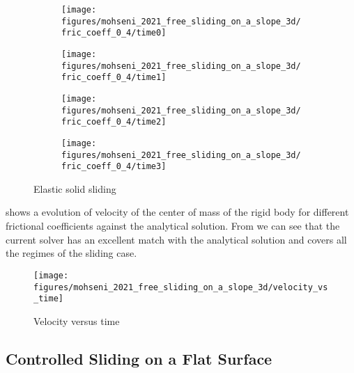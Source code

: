 \documentclass[preprint,12pt]{elsarticle}
\begin{document}
\begin{figure}[!htpb]
  \centering
  \begin{subfigure}{0.48\textwidth}
    \centering
    \texttt{[image: figures/mohseni\_2021\_free\_sliding\_on\_a\_slope\_3d/fric\_coeff\_0\_4/time0]}
    \label{fig:passing-0}
  \end{subfigure}
  \begin{subfigure}{0.48\textwidth}
    \centering
    \texttt{[image: figures/mohseni\_2021\_free\_sliding\_on\_a\_slope\_3d/fric\_coeff\_0\_4/time1]}
    \label{fig:passing-1}
  \end{subfigure}

  \begin{subfigure}{0.48\textwidth}
    \centering
    \texttt{[image: figures/mohseni\_2021\_free\_sliding\_on\_a\_slope\_3d/fric\_coeff\_0\_4/time2]}
    \label{fig:passing-2}
  \end{subfigure}
  \begin{subfigure}{0.48\textwidth}
    \centering
    \texttt{[image: figures/mohseni\_2021\_free\_sliding\_on\_a\_slope\_3d/fric\_coeff\_0\_4/time3]}
    \label{fig:passing-3}
  \end{subfigure}
  \caption{Elastic solid sliding}
\label{fig:mohseni-2021-sliding-3d}
\end{figure}
%

 shows a evolution of
velocity of the center of mass of the rigid body for different frictional
coefficients against the analytical solution. From
 we can see that the current
solver has an excellent match with the analytical solution and covers all the
regimes of the sliding case.


\begin{figure}[!htpb]
  \centering
  \texttt{[image: figures/mohseni\_2021\_free\_sliding\_on\_a\_slope\_3d/velocity\_vs\_time]}
  \caption{Velocity versus time}
\label{fig:results-solid-sliding-velocity-vs-time}
\end{figure}


\subsection{Controlled Sliding on a Flat Surface}
\label{sec:controlled-rigid-body-sliding}
\end{document}
